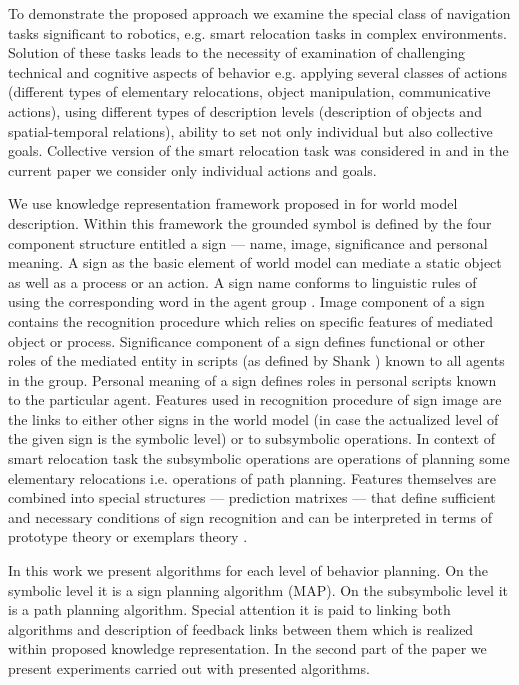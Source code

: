 \documentclass[procedia]{easychair}
\begin{document}
To demonstrate the proposed approach we examine the special class of navigation tasks significant to robotics, e.g. smart relocation tasks in complex environments. Solution of these tasks leads to the necessity of examination of challenging technical and cognitive aspects of behavior e.g. applying several classes of actions (different types of elementary relocations, object manipulation, communicative actions), using different types of description levels (description of objects and spatial-temporal relations), ability to set not only individual but also collective goals. Collective version of the smart relocation task was considered in \cite{Panov2016a} and in the current paper we consider only individual actions and goals.

We use knowledge representation framework proposed in \cite{Osipov2014b,Osipov2015e} for world model description. Within this framework the grounded symbol \cite{Harnad1990} is defined by the four component structure entitled a sign --- name, image, significance and personal meaning. A sign as the basic element of world model can mediate a static object as well as a process or an action. A sign name conforms to linguistic rules of using the corresponding word in the agent group \cite{Steels2012}. Image component of a sign contains the recognition procedure which relies on specific features of mediated object or process. Significance component of a sign defines functional or other roles of the mediated entity in scripts (as defined by Shank \cite{Schank1972}) known to all agents in the group. Personal meaning of a sign defines roles in personal scripts known to the particular agent. Features used in recognition procedure of sign image are the links to either other signs in the world model (in case the actualized level of the given sign is the symbolic level) or to subsymbolic operations. In context of smart relocation task the subsymbolic operations are operations of planning some elementary relocations i.e. operations of path planning. Features themselves are combined into special structures --- prediction matrixes --- that define sufficient and necessary conditions of sign recognition and can be interpreted in terms of prototype theory or exemplars theory \cite{Machery2011}.

In this work we present algorithms for each level of behavior planning. On the symbolic level it is a sign planning algorithm (MAP). On the subsymbolic level it is a path planning algorithm. Special attention it is paid to linking both algorithms and description of feedback links between them which is realized within proposed knowledge representation. In the second part of the paper we present experiments carried out with presented algorithms.
\end{document}
